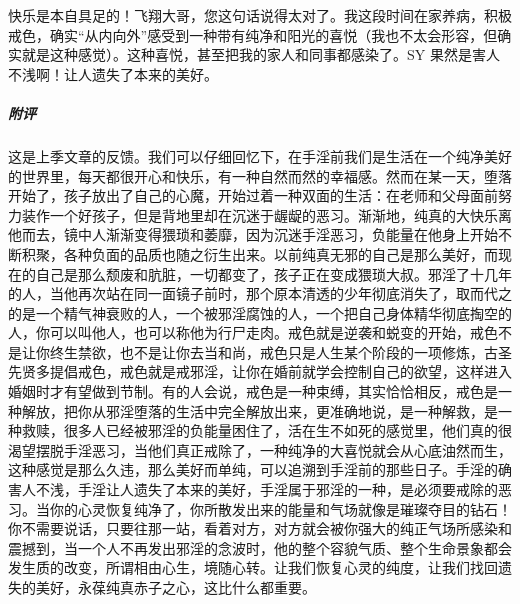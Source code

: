 \begin{case}
    快乐是本自具足的！飞翔大哥，您这句话说得太对了。我这段时间在家养病，积极戒色，确实“从内向外”感受到一种带有纯净和阳光的喜悦（我也不太会形容，但确实就是这种感觉）。这种喜悦，甚至把我的家人和同事都感染了。SY 果然是害人不浅啊！让人遗失了本来的美好。
    \subparagraph{附评} 这是上季文章的反馈。我们可以仔细回忆下，在手淫前我们是生活在一个纯净美好的世界里，每天都很开心和快乐，有一种自然而然的幸福感。然而在某一天，堕落开始了，孩子放出了自己的心魔，开始过着一种双面的生活：在老师和父母面前努力装作一个好孩子，但是背地里却在沉迷于龌龊的恶习。渐渐地，纯真的大快乐离他而去，镜中人渐渐变得猥琐和萎靡，因为沉迷手淫恶习，负能量在他身上开始不断积聚，各种负面的品质也随之衍生出来。以前纯真无邪的自己是那么美好，而现在的自己是那么颓废和肮脏，一切都变了，孩子正在变成猥琐大叔。邪淫了十几年的人，当他再次站在同一面镜子前时，那个原本清透的少年彻底消失了，取而代之的是一个精气神衰败的人，一个被邪淫腐蚀的人，一个把自己身体精华彻底掏空的人，你可以叫他人，也可以称他为行尸走肉。戒色就是逆袭和蜕变的开始，戒色不是让你终生禁欲，也不是让你去当和尚，戒色只是人生某个阶段的一项修炼，古圣先贤多提倡戒色，戒色就是戒邪淫，让你在婚前就学会控制自己的欲望，这样进入婚姻时才有望做到节制。有的人会说，戒色是一种束缚，其实恰恰相反，戒色是一种解放，把你从邪淫堕落的生活中完全解放出来，更准确地说，是一种解救，是一种救赎，很多人已经被邪淫的负能量困住了，活在生不如死的感觉里，他们真的很渴望摆脱手淫恶习，当他们真正戒除了，一种纯净的大喜悦就会从心底油然而生，这种感觉是那么久违，那么美好而单纯，可以追溯到手淫前的那些日子。手淫的确害人不浅，手淫让人遗失了本来的美好，手淫属于邪淫的一种，是必须要戒除的恶习。当你的心灵恢复纯净了，你所散发出来的能量和气场就像是璀璨夺目的钻石！你不需要说话，只要往那一站，看着对方，对方就会被你强大的纯正气场所感染和震撼到，当一个人不再发出邪淫的念波时，他的整个容貌气质、整个生命景象都会发生质的改变，所谓相由心生，境随心转。让我们恢复心灵的纯度，让我们找回遗失的美好，永葆纯真赤子之心，这比什么都重要。
\end{case}


